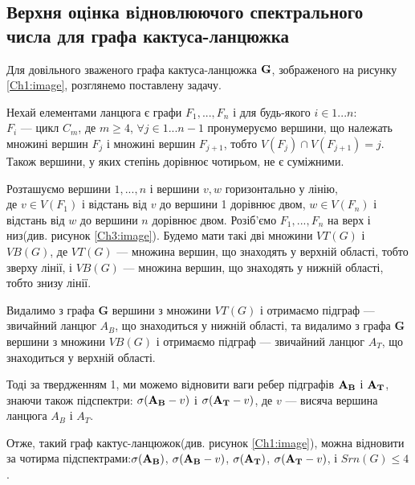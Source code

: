\subsection{Верхня оцiнка вiдновлюючого спектрального числа для графа кактуса-ланцюжка}

Для довільного зваженого графа кактуса-ланцюжка ${\bf G}$, зображеного на рисунку \ref{Ch1:image}, розглянемо поставлену задачу.

Нехай елементами ланцюга є графи $F_1,...,F_n$ і для будь-якого $i \in 1...n$:\\ $F_i$ --- цикл $C_m$, де $m\geq4$, $\forall j \in 1...n-1$ пронумеруємо вершини, що належать множині вершин $F_j$ і множині вершин $F_{j+1}$, тобто 
$V(F_j)\cap V(F_{j+1})=j$. Також вершини, у яких степінь дорівнює чотирьом, не є суміжними.



Розташуємо вершини $1,...,n$ і вершини $v, w$ горизонтально у лінію,\\ де $v\in V(F_1)$ і відстань від $v$ до вершини 1 дорівнює двом, $w\in V(F_n)$ і відстань від $w$ до вершини $n$ дорівнює двом. Розіб'ємо $F_1,...,F_n$ на верх і низ(див. рисунок \ref{Ch3:image}). Будемо мати такі дві множини  $VT({G})$ і $VB({G})$, де $VT({G})$ --- множина вершин, що знаходять у верхній області, тобто зверху лінії, і $VB({G})$ --- множина вершин, що знаходять у нижній області, тобто знизу лінії.

Видалимо з графа \textbf{G} вершини з множини $VT({G})$ і отримаємо підграф --- звичайний ланцюг $A_B$, що знаходиться у нижній області, та видалимо з графа \textbf{G} вершини з множини $VB({G})$ і отримаємо підграф --- звичайний ланцюг $A_T$, що знаходиться у верхній області.

Тоді за твердженням 1, ми можемо відновити ваги ребер підграфів $\bf A_B$ і $\bf A_T$, знаючи також підспектри: $\sigma({\bf A_B}-v)$ і $\sigma({\bf A_T}-v)$, де $v$ --- висяча вершина ланцюга $A_B$ і $A_T$.

Отже, такий граф кактус-ланцюжок(див. рисунок \ref{Ch1:image}), можна відновити за чотирма підспектрами:$\sigma({\bf A_B})$, $\sigma({\bf A_B}-v)$, $\sigma({\bf A_T})$, $\sigma({\bf A_T}-v)$, і $Srn({G})\leq4$.